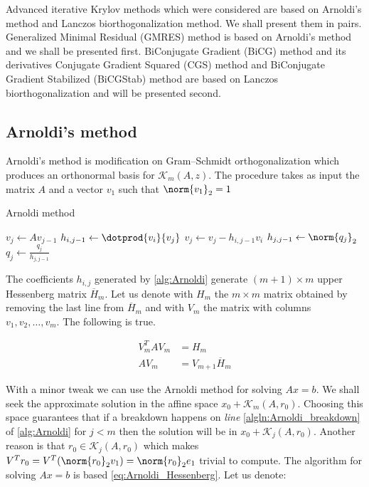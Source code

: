 Advanced iterative Krylov methods which were considered are based on Arnoldi's method and Lanczos biorthogonalization method. We
shall present them in pairs. Generalized Minimal Residual (GMRES) method is based on Arnoldi's method and we shall be presented first. BiConjugate Gradient (BiCG) method and its derivatives Conjugate Gradient Squared (CGS) method and BiConjugate Gradient Stabilized (BiCGStab) method are based on Lanczos biorthogonalization and will be presented second.

\subsection{Arnoldi's method}
Arnoldi's method is modification on Gram--Schmidt orthogonalization which produces an orthonormal basis for $\mathcal{K}_m(A, z)$. The procedure takes as input the matrix $A$ and a vector $v_1$ such that $\norm{v_1}_2 = 1$
\begin{algorithm}[H]
 \centering
 \caption{Arnoldi method}\label{alg:Arnoldi}
 \begin{algorithmic}[1]
				\State $v_j \gets Av_{j-1}$
					\State $h_{i,j-1} \gets \dotprod{v_i}{v_j}$
					\State $v_j \gets v_j - h_{i,j-1} v_i$
				\EndFor
				\State $h_{j,j-1} \gets \norm{q_j}_2$
				\State $q_j \gets \frac{q_j}{h_{j,j-1}}$\label{algln:Arnoldi_breakdown}
			\EndFor
		\EndProcedure
 \end{algorithmic}
\end{algorithm}

\begin{proposition}The coefficients $h_{i,j}$ generated by \cref{alg:Arnoldi} generate $(m+1) \times m$ upper Hessenberg matrix $\overline{H}_m$. Let us denote with $H_m$ the $m \times m$ matrix obtained by removing the last line from $\overline{H}_m$ and with $V_m$ the matrix with columns $v_1, v_2, \dots, v_m$. The following is true.

	\begin{align}
		V^T_mAV_m &= H_m \label{eq:Arnoldi_Hessenberg} \\
		AV_m &= V_{m+1}\overline{H}_m \label{eq:Arnoldi_Hessenberg_m+1}
	\end{align}
\end{proposition}

With a minor tweak we can use the Arnoldi method for solving $Ax=b$. We shall seek the approximate solution in the affine space $x_0 + \mathcal{K}_m(A, r_0)$. Choosing this space guarantees that if a breakdown happens on \textit{line} \cref{algln:Arnoldi_breakdown} of \cref{alg:Arnoldi} for $j < m$ then the solution will be in $x_0 + \mathcal{K}_{j}(A, r_0)$. Another reason is that $r_0 \in \mathcal{K}_{j}(A, r_0)$ which makes $V^Tr_0 = V^T(\norm{r_0}_2v_1) = \norm{r_0}_2e_1$ trivial to compute. The algorithm for solving $Ax = b$ is based \cref{eq:Arnoldi_Hessenberg}. Let us denote:

